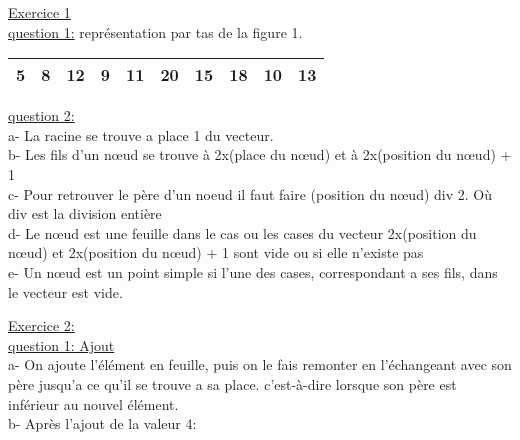 \documentclass [11pt]{report}
\begin{document}
\underline{{\huge Exercice 1}}\\
\indent \underline{question 1:} \vspace{2.5mm}
	 repr\'esentation par tas de la figure 1.\\
\begin{tabular}{|c|c|c|c|c|c|c|c|c|c|}
\hline 5 & 8 & 12 & 9 & 11 & 20 & 15 & 18 & 10 & 13 \\ 
\hline 
\end{tabular} 

\vspace{5mm}

\indent \underline{question 2:}\\
a- La racine se trouve a place 1 du vecteur.\\
b- Les fils d'un nœud se trouve \`a 2x(place du nœud) et \`a 2x(position du nœud) + 1 \\
c- Pour retrouver le p\`ere d'un noeud il faut faire (position du nœud) div 2. O\`u div est la division enti\`ere\\
d- Le nœud est une feuille dans le cas ou les cases du vecteur 2x(position du nœud) et 2x(position du nœud) + 1 sont vide ou si elle n'existe pas\\
e- Un nœud est un point simple si l'une des cases, correspondant a ses fils, dans le vecteur est vide.\\

\vspace{10mm}

\underline{{\huge Exercice 2:}}\\
\indent \underline{question 1: Ajout}\\
\indent a- On ajoute l'\'el\'ement en feuille, puis on le fais remonter en l'\'echangeant avec son p\`ere jusqu'a ce qu'il se trouve a sa place. c'est-\`a-dire lorsque son p\`ere est inf\'erieur au nouvel \'el\'ement.\\
\indent b- Apr\`es l'ajout de la valeur 4:
\end{document}

